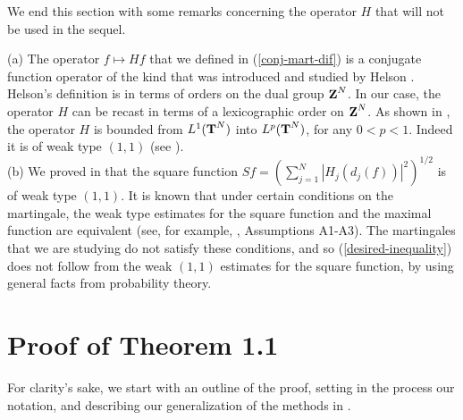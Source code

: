 We end this section with some remarks
concerning the operator $H$ that will not be used in the sequel.
\begin{remarks}
{\rm
(a)  The operator $f\mapsto Hf$ that we defined in 
(\ref{conj-mart-dif})
is a conjugate function operator
 of the kind that was introduced
and studied by Helson \cite{hel}.
Helson's definition is in terms of orders on the
dual group $\Z^N$.  In our case, the operator
$H$ can be recast in terms of a lexicographic order on
$\Z^N$.  As shown in \cite{hel}, the operator
$H$ is bounded from $L^1(\T^N)$ into $L^p(\T^N)$,
for any $0<p<1$.  Indeed it is of weak type $(1,1)$
(see \cite[Theorem 4.3]{ams}).\\
(b)
We proved in \cite[Theorem 5.4]{ams} that the 
square function $Sf=\left(
\sum_{j=1}^N
|H_j(d_j(f))|^2
\right)^{1/2}$
is of weak type $(1,1)$.  
It is known that under certain conditions
on the martingale, the weak type estimates for 
the square function and the maximal function
are equivalent (see, for example, 
\cite{bg}, Assumptions A1-A3).  The martingales that we
are studying do not satisfy these conditions,
and so 
(\ref{desired-inequality})
does not follow from the weak $(1,1)$
estimates for the square function,
by using general facts from probability theory.
}
\label{remarks}
\end{remarks}
\section{Proof of Theorem 1.1}
%
\newtheorem{lemma5.1}{Lemma}[section]
\newtheorem{lemma5.2}[lemma5.1]{Lemma}
\newtheorem{lemma5.3}[lemma5.1]{Lemma}
\newtheorem{lemma5.4}[lemma5.1]{Lemma}
%
%
For clarity's sake, we start with an outline of the proof,
setting in the process our notation, and describing our 
generalization of the methods in \cite{bgs}.


